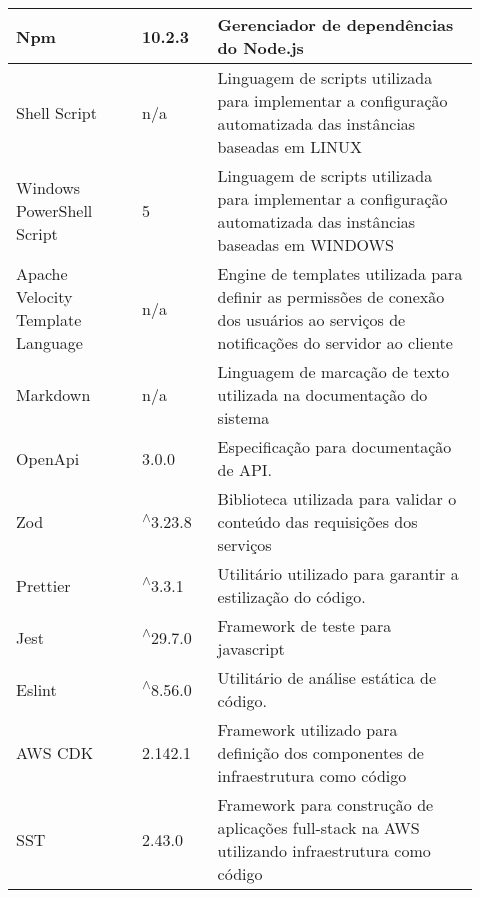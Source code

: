 \begin{longtable}{p{0.25\linewidth} p{0.15\linewidth} p{0.525\linewidth}}
Npm & 10.2.3 & Gerenciador de dependências do Node.js \\

\hline

Shell Script & \gls{n/a} & Linguagem de scripts utilizada para implementar a configuração automatizada das instâncias baseadas em LINUX \\

\hline

Windows PowerShell Script & 5 & Linguagem de scripts utilizada para implementar a configuração automatizada das instâncias baseadas em WINDOWS \\

\hline

Apache Velocity Template Language & \gls{n/a} & Engine de templates utilizada para definir as permissões de conexão dos usuários ao serviços de notificações do servidor ao cliente \\

\hline

Markdown & \gls{n/a} & Linguagem de marcação de texto utilizada na documentação do sistema \\

\hline

OpenApi & 3.0.0 & Especificação para documentação de API. \\

\hline

Zod & \textsuperscript{$\wedge$}3.23.8 & Biblioteca utilizada para validar o conteúdo das requisições dos serviços \\

\hline

Prettier & \textsuperscript{$\wedge$}3.3.1 & Utilitário utilizado para garantir a estilização do código. \\

\hline

Jest & \textsuperscript{$\wedge$}29.7.0 & Framework de teste para javascript \\

\hline

Eslint & \textsuperscript{$\wedge$}8.56.0 & Utilitário de análise estática de código. \\

\hline

AWS CDK & 2.142.1 & Framework utilizado para definição dos componentes de infraestrutura como código \\

\hline

SST & 2.43.0 & Framework para construção de aplicações full-stack na AWS utilizando infraestrutura como código \\


\end{longtable}
